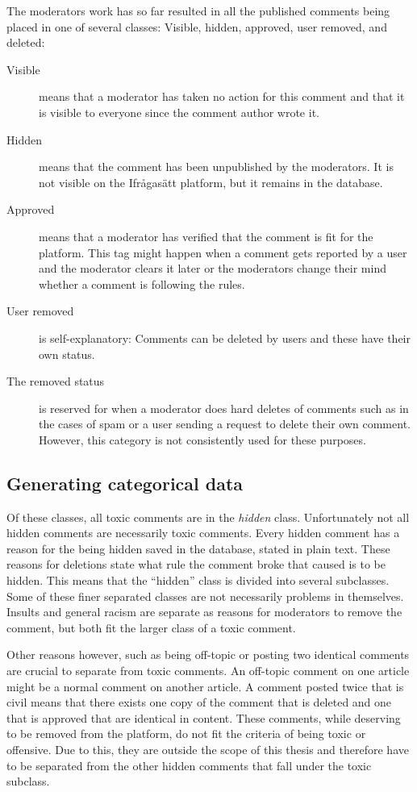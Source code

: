 \documentclass[nofilelist]{cslthse-msc}
\begin{document}
The moderators work has so far resulted in all the published comments being placed in one of several classes: Visible, hidden, approved, user removed, and deleted:%
\begin{description}
  \item[Visible] means that a moderator has taken no action for this comment and that it is visible to everyone since the comment author wrote it.
  \item[Hidden] means that the comment has been unpublished by the moderators. It is not visible on the Ifrågasätt platform, but it remains in the database.
\item[Approved] means that a moderator has verified that the comment is fit for the platform. This tag might happen when a comment gets reported by a user and the moderator clears it later or the moderators change their mind whether a comment is following the rules. 
\item[User removed] is self-explanatory: Comments can be deleted by users and these have their own status. 

\item[The removed status] is reserved for when a moderator does hard deletes of comments such as in the cases of spam or a user sending a request to delete their own comment. However, this category is not consistently used for these purposes.
\end{description}

\subsection{Generating categorical data}

Of these classes, all toxic comments are in the \emph{hidden} class. Unfortunately not all hidden comments are necessarily toxic comments. Every hidden comment has a reason for the being hidden saved in the database, stated in plain text. These reasons for deletions state what rule the comment broke that caused is to be hidden. This means that the ``hidden'' class is divided into several subclasses. Some of these finer separated classes are not necessarily problems in themselves. Insults and general racism are separate as reasons for moderators to remove the comment, but both fit the larger class of a toxic comment. 

Other reasons however, such as being off-topic or posting two identical comments are crucial to separate from toxic comments. An off-topic comment on one article might be a normal comment on another article. A comment posted twice that is civil means that there exists one copy of the comment that is deleted and one that is approved that are identical in content. These comments, while deserving to be removed from the platform, do not fit the criteria of being toxic or offensive. Due to this, they are outside the scope of this thesis and therefore have to be separated from the other hidden comments that fall under the toxic subclass.
\end{document}
